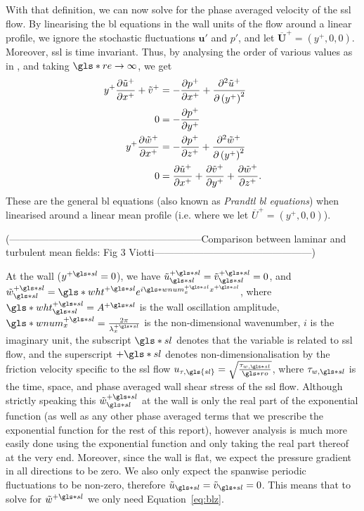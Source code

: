 With that definition, we can now solve for the phase averaged velocity of the \gls{ssl} flow. By linearising the \gls{bl} equations in the wall units of the flow around a linear profile, we ignore the stochastic fluctuations $\mathbf{u'} $ and $p'$, and let $\overline{\mathbf{U} }^{+} = (y^{+},0,0)$. Moreover, \gls{ssl} is time invariant. Thus, by analysing the order of various values as in \cite{schlichting2016}, and taking $\gls*{re}\to \infty$, we get
\begin{align}
	y^{+} \pdv{\tilde{u}^{+}}{x^{+}} + \tilde{v}^{+} &= -\pdv{p^{+}}{x^{+}} + \pdv[2]{\tilde{u}^{+}}{\left(y^{+}\right)} \label{eq:blx}\\
	0 &= -\pdv{p^{+}}{y^{+}}  \label{eq:bly}\\
	y^{+} \pdv{\tilde{w}^{+}}{x^{+}} &= -\pdv{p^{+}}{z^{+}} + \pdv[2]{\tilde{w}^{+}}{\left( y^{+} \right) } \label{eq:blz}\\
	0 &= \pdv{\tilde{u}^{+}}{x^{+}} +\pdv{\tilde{v}^{+}}{y^{+}} +\pdv{\tilde{w}^{+}}{z^{+}} \label{eq:blc}
.\end{align}
These are the general \gls{bl} equations (also known as \textit{Prandtl \gls{bl} equations}) when linearised around a linear mean profile (i.e. where we let $\overline{U}^{+}=\left(y^{+},0,0\right)$).

(-----------------------------------------------------------Comparison between laminar and turbulent mean fields: Fig 3 Viotti------------------------------------------------)

At the wall ($y\ps=0$), we have $\tilde{u}\ssl\ps=\tilde{v}\ssl\ps=0$, and $\tilde{w}\ssl\ps=\gls*{wht}\ps e^{i \gls*{wnum}_x\ps x\ps}$, where $\gls*{wht}\ps\ssl=A\ps$ is the wall oscillation amplitude, $\gls*{wnum}_x\ps = \frac{2\pi}{\lambda_x\ps}$ is the non-dimensional wavenumber, $i$ is the imaginary unit, the subscript $\gls*{sl}$ denotes that the variable is related to \gls{ssl} flow, and the superscript $+\gls*{sl}$ denotes non-dimensionalisation by the friction velocity specific to the \gls{ssl} flow $u_{\tau,\gls{sl}}=\sqrt{\frac{\tau_{w,\gls*{sl}}}{\gls*{ro}}} $, where $\tau_{w,\gls*{sl}}$ is the time, space, and phase averaged wall shear stress of the  \gls{ssl} flow. Although strictly speaking this $\tilde{w}\ssl\ps$ at the wall is only the real part of the exponential function (as well as any other phase averaged terms that we prescribe the exponential function for the rest of this report), however analysis is much more easily done using the exponential function and only taking the real part thereof at the very end. Moreover, since the wall is flat, we expect the pressure gradient in all directions to be zero. We also only expect the spanwise periodic fluctuations to be non-zero, therefore $\tilde{u}\ssl=\tilde{v}\ssl=0  $. This means that to solve for $\tilde{w}\ps$ we only need Equation~\eqref{eq:blz}.

